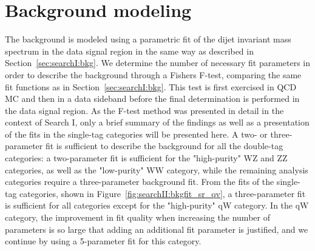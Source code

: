 \section{Background modeling} 
\label{sec:searchII:ftest}
The background is modeled using a parametric fit of the dijet invariant mass spectrum in the data signal region in the same way as described in Section~\ref{sec:searchI:bkg}. We determine the number of necessary fit parameters in order to describe the background through a Fishers F-test, comparing the same fit functions as in Section~\ref{sec:searchI:bkg}. This test is first exercised in QCD MC and then in a data sideband before the final determination is performed in the data signal region. As the F-test method was presented in detail in the context of Search I, only a brief summary of the findings as well as a presentation of the fits in the single-tag categories will be presented here. A two- or three-parameter fit is sufficient to describe the background for all the double-tag categories: a two-parameter fit is sufficient for the "high-purity" WZ and ZZ categories, as well as the "low-purity" WW category, while the remaining analysis categories require a three-parameter background fit.
From the fits of the single-tag categories, shown in Figure~\ref{fig:searchII:bkgfit_sr_qv}, a three-parameter fit is sufficient for all categories except for the "high-purity" qW category. In the qW category, the improvement in fit quality when increasing the number
of parameters is so large that adding an additional fit parameter is justified, and we continue by using a 5-parameter fit for this category. 
